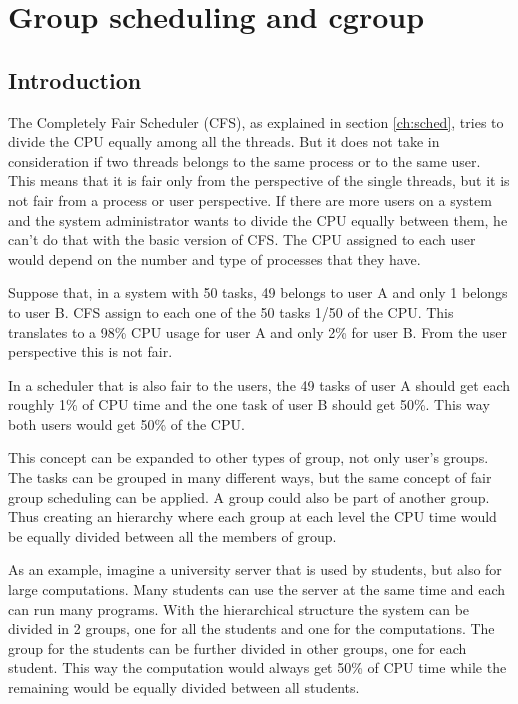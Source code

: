 \chapter{Group scheduling and cgroup} %
\label{ch:cgroup}
\section{Introduction}

The Completely Fair Scheduler (CFS), as explained in section \ref{ch:sched}, tries to divide the CPU equally among all the threads. But it does not take in consideration if two threads belongs to the same process or to the same user. This means that it is fair only from the perspective of the single threads, but it is not fair from a process or user perspective. If there are more users on a system and the system administrator wants to divide the CPU equally between them, he can't do that with the basic version of CFS. The CPU assigned to each user would depend on the number and type of processes that they have.

Suppose that, in a system with 50 tasks, 49 belongs to user A and only 1 belongs to user B. CFS assign to each one of the 50 tasks 1/50 of the CPU. This translates to a 98\% CPU usage for user A and only 2\% for user B. From the user perspective this is not fair.

In a scheduler that is also fair to the users, the 49 tasks of user A should get each roughly 1\% of CPU time and the one task of user B should get 50\%. This way both users would get 50\% of the CPU. 

This concept can be expanded to other types of group, not only user's groups. The tasks can be grouped in many different ways, but the same concept of fair group scheduling can be applied. A group could also be part of another group. Thus creating an hierarchy where each group at each level the CPU time would be equally divided between all the members of group.

As an example, imagine a university server that is used by students, but also for large computations. Many students can use the server at the same time and each can run many programs. With the hierarchical structure the system can be divided in 2 groups, one for all the students and one for the computations. The group for the students can be further divided in other groups, one for each student. This way the computation would always get 50\% of CPU time while the remaining would be equally divided between all students.

